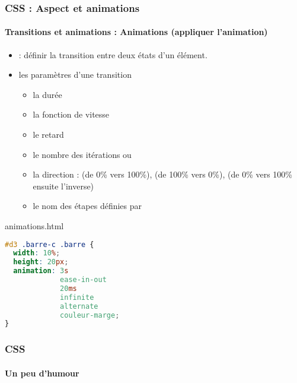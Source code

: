 \documentclass[xcolor=table]{beamer}
\begin{document}
\begin{frame}[fragile]
\frametitle{CSS : Aspect et animations}
\framesubtitle{Transitions et animations : Animations (appliquer l'animation)}

\begin{minipage}{0.60\textwidth}
	\begin{itemize}
		\item {} : définir la transition entre deux états d'un élément.
		\item les paramètres d'une transition 
		\begin{itemize}
			\item la durée 
			\item la fonction de vitesse
			\item le retard
			\item le nombre des itérations ou 
			\item la direction :  (de 0\% vers 100\%),  (de 100\% vers 0\%),  (de 0\% vers 100\% ensuite l'inverse) 
			\item le nom des étapes définies par 
		\end{itemize}
	\end{itemize}
\end{minipage}
%
\begin{minipage}{0.38\textwidth}
\begin{exampleblock}{animations.html}
\lstset{escapeinside=**}
\scriptsize\bfseries\vspace{-6pt}
\begin{lstlisting}[language={CSS}]
#d3 .barre-c .barre {
  width: 10%;
  height: 20px;
  animation: 3s 
             ease-in-out 
             20ms 
             infinite 
             alternate 
             couleur-marge;
}
\end{lstlisting}\vspace{-6pt}
\end{exampleblock}
\end{minipage}
\end{frame}


\begin{frame}
\frametitle{CSS}
\framesubtitle{Un peu d'humour}

\begin{center}
\end{center}

\end{frame}

\end{document}
